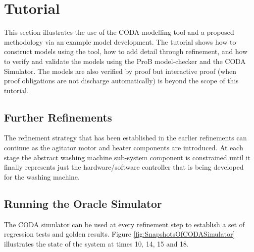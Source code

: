 \section{Tutorial}
\label{sec:component_diagrams-tutorial}

This section illustrates the use of the CODA modelling tool and a proposed methodology via an example model development. The tutorial shows how to construct models using the tool, how to add detail through refinement, and how to verify and validate the models using the ProB model-checker and the CODA Simulator. The models are also verified by proof but interactive proof (when proof obligations are not discharge automatically) is beyond the scope of this tutorial.
 
 
 
 
 
 
 
\subsection{Further Refinements}
 
The refinement strategy that has been established in the earlier refinements can continue as the agitator motor and heater components are introduced. At each stage the abstract washing machine sub-system component is constrained until it finally represents just the
  hardware/software controller
   that is being developed for the washing machine.
 
\subsection{Running the Oracle Simulator}
 
The CODA simulator can be used at every refinement step to establish a set of regression tests and golden results. Figure \ref{fig:SnapshotsOfCODASimulator} illustrates the state of the system at times 10, 14, 15 and 18.

